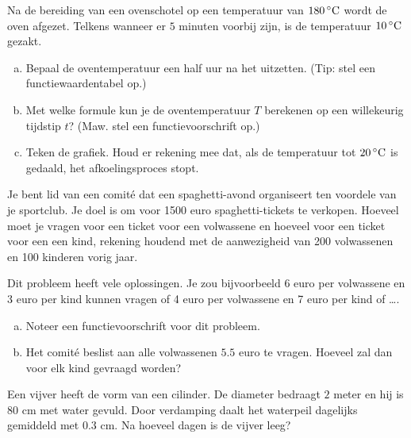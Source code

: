 \documentclass[12pt]{article}
\begin{document}
\begin{oefening}
Na de bereiding van een ovenschotel op een temperatuur van $180\grC$ wordt de oven afgezet. Telkens wanneer er $5$ minuten voorbij zijn, is de temperatuur $10\grC$ gezakt.
\begin{enumerate}[(a)]
  \item Bepaal de oventemperatuur een half uur na het uitzetten. (Tip: stel een functiewaardentabel op.)
  \item Met welke formule kun je de oventemperatuur $T$ berekenen op een willekeurig tijdstip $t$? (Maw. stel een functievoorschrift op.)
  \item Teken de grafiek. Houd er rekening mee dat, als de temperatuur tot $20\grC$ is gedaald, het afkoelingsproces stopt.
\end{enumerate}
\end{oefening}

\begin{oefening}
Je bent lid van een comité dat een spaghetti-avond organiseert ten voordele van je sportclub. Je doel is om voor 1500 euro spaghetti-tickets te verkopen. Hoeveel moet je vragen voor een ticket voor een volwassene en hoeveel voor een ticket voor een een kind, rekening houdend met de aanwezigheid van 200 volwassenen en 100 kinderen vorig jaar.

Dit probleem heeft vele oplossingen. Je zou bijvoorbeeld 6 euro per volwassene en 3 euro per kind kunnen vragen of 4 euro per volwassene en 7 euro per kind of \ldots.
\begin{enumerate}[(a)]
  \item Noteer een functievoorschrift voor dit probleem.
  \item Het comité beslist aan alle volwassenen $5.5$ euro te vragen. Hoeveel zal dan voor elk kind gevraagd worden?
\end{enumerate}
\end{oefening}

\begin{oefening}
Een vijver heeft de vorm van een cilinder. De diameter bedraagt $2$ meter en hij is $80$ cm met water gevuld. Door verdamping daalt het waterpeil dagelijks gemiddeld met $0.3$ cm. Na hoeveel dagen is de vijver leeg?
\end{oefening}
\end{document}
